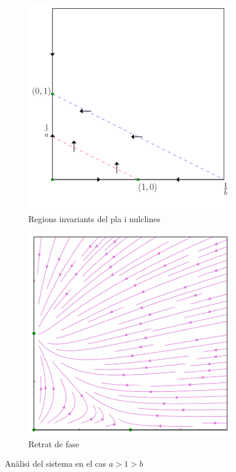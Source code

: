 \documentclass[12pt]{article}
\numberwithin{table}{section}
\numberwithin{equation}{section}
\numberwithin{figure}{section}
\begin{document}
\begin{figure}
	\centering
	\begin{subfigure}[htb]{0.48\textwidth}
		\centering
		\includegraphics[width=\textwidth]{retrat-3a.pdf}
		\caption{Regions invariants del pla i nulclines}
		\label{fig:retrat 3a}
	\end{subfigure}
	\begin{subfigure}[htb]{0.48\textwidth}
		\centering
		\includegraphics[width=\textwidth]{retrat-3b.pdf}
		\caption{Retrat de fase}
		\label{fig:retrat 3b}
	\end{subfigure}
	\caption{Anàlisi del sistema en el cas \( a > 1 > b \)}
	\label{fig:retrat 3}
\end{figure}
\end{document}
